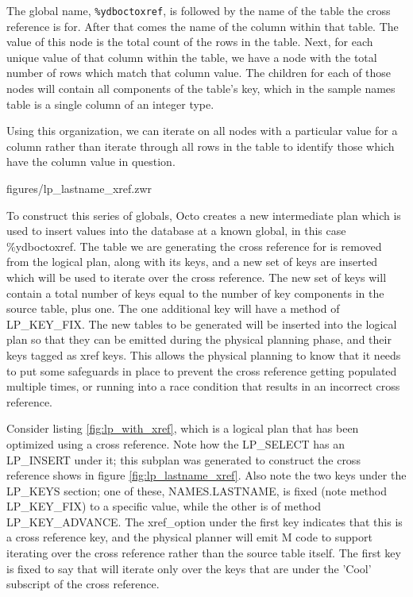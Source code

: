 \documentclass[]{article}
\def\code#1{\texttt{#1}}
\begin{document}
The global name, \code{\%ydboctoxref}, is followed by the name of the table the cross reference is for.
After that comes the name of the column within that table.
The value of this node is the total count of the rows in the table.
Next, for each unique value of that column within the table, we have a node with the total number of rows which match that column value.
The children for each of those nodes will contain all components of the table's key, which in the sample names table is a single column of an integer type.

Using this organization, we can iterate on all nodes with a particular value for a column rather than iterate through all rows in the table to identify those which have the column value in question.


{figures/lp_lastname_xref.zwr}

To construct this series of globals, Octo creates a new intermediate plan which is used to insert values into the database at a known global, in this case \%ydboctoxref.
The table we are generating the cross reference for is removed from the logical plan, along with its keys, and a new set of keys are inserted which will be used to iterate over the cross reference.
The new set of keys will contain a total number of keys equal to the number of key components in the source table, plus one.
The one additional key will have a method of LP\_KEY\_FIX.
The new tables to be generated will be inserted into the logical plan so that they can be emitted during the physical planning phase, and their keys tagged as xref keys.
This allows the physical planning to know that it needs to put some safeguards in place to prevent the cross reference getting populated multiple times, or running into a race condition that results in an incorrect cross reference.

Consider listing \ref{fig:lp_with_xref}, which is a logical plan that has been optimized using a cross reference.
Note how the LP\_SELECT has an LP\_INSERT under it; this subplan was generated to construct the cross reference shows in figure \ref{fig:lp_lastname_xref}.
Also note the two keys under the LP\_KEYS section; one of these, NAMES.LASTNAME, is fixed (note method LP\_KEY\_FIX) to a specific value, while the other is of method LP\_KEY\_ADVANCE.
The xref\_option under the first key indicates that this is a cross reference key, and the physical planner will emit M code to support iterating over the cross reference rather than the source table itself.
The first key is fixed to say that will iterate only over the keys that are under the 'Cool' subscript of the cross reference.
\end{document}
